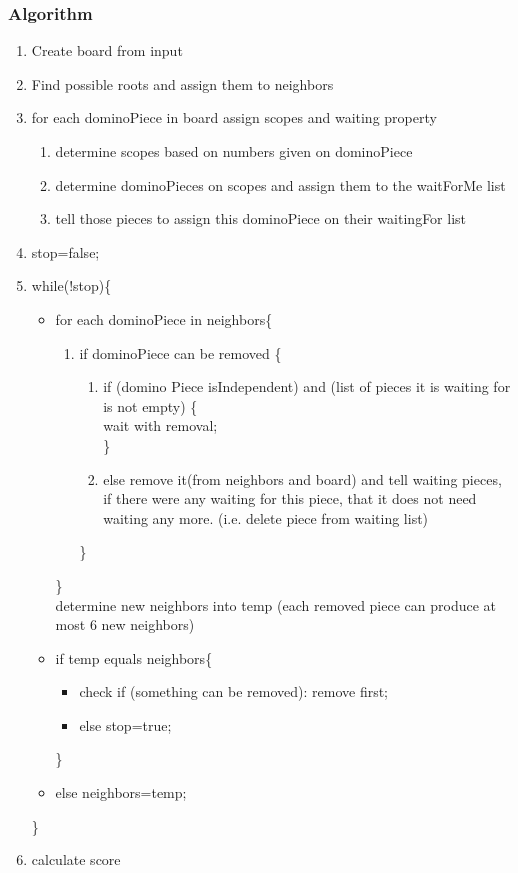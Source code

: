 \subsubsection{Algorithm}
\begin{enumerate}
   \item Create board from input
   \item Find possible roots and assign them to neighbors
   \item for each dominoPiece in board assign scopes and waiting property
   \begin{enumerate}
      \item determine scopes based on numbers given on dominoPiece
      \item determine dominoPieces on scopes and assign them to the waitForMe list
      \item tell those pieces to assign this dominoPiece on their waitingFor list
   \end{enumerate}
   \item stop=false;
   \item while(!stop)\{
   \begin{itemize}[noitemsep,nolistsep]
     \item for each dominoPiece in neighbors\{
         \begin{enumerate}
            \item if dominoPiece can be removed \{
            \begin{enumerate}
               \item if (domino Piece isIndependent) and (list of pieces it is waiting for is not empty) \{ \\
                  wait with removal; \\
               \}
               \item else
                  remove it(from neighbors and board) and tell waiting pieces, if there were any waiting
                  for this piece, that it does not need waiting any more. (i.e. delete piece from waiting
                  list)
            \end{enumerate}
            \}
         \end{enumerate}
         \} \\
         determine new neighbors into temp (each removed piece can produce at most 6 new neighbors)
     \item if temp equals neighbors\{
         \begin{itemize}[noitemsep,nolistsep]
            \item check if (something can be removed): remove first;
            \item else stop=true;
         \end{itemize}
         \}
     \item else neighbors=temp;
   \end{itemize}
   \}
   \item calculate score
\end{enumerate}
